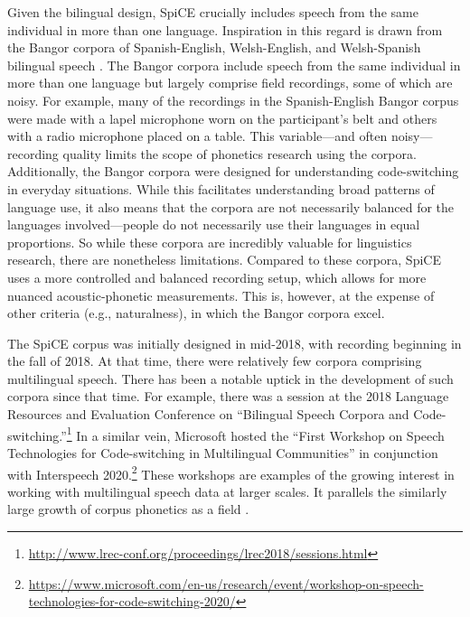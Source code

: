 Given the bilingual design, SpiCE crucially includes speech from the same individual in more than one language. Inspiration in this regard is drawn from the Bangor corpora of Spanish-English, Welsh-English, and Welsh-Spanish bilingual speech \citep{deuchar_2014_corpora}. The Bangor corpora include speech from the same individual in more than one language but largely comprise field recordings, some of which are noisy. For example, many of the recordings in the Spanish-English Bangor corpus were made with a lapel microphone worn on the participant's belt and others with a radio microphone placed on a table. This variable---and often noisy---recording quality limits the scope of phonetics research using the corpora. Additionally, the Bangor corpora were designed for understanding code-switching in everyday situations. While this facilitates understanding broad patterns of language use, it also means that the corpora are not necessarily balanced for the languages involved---people do not necessarily use their languages in equal proportions. So while these corpora are incredibly valuable for linguistics research, there are nonetheless limitations. Compared to these corpora, SpiCE uses a more controlled and balanced recording setup, which allows for more nuanced acoustic-phonetic measurements. This is, however, at the expense of other criteria (e.g., naturalness), in which the Bangor corpora excel.

The SpiCE corpus was initially designed in mid-2018, with recording beginning in the fall of 2018. At that time, there were relatively few corpora comprising multilingual speech. There has been a notable uptick in the development of such corpora since that time. For example, there was a session at the 2018 Language Resources and Evaluation Conference on ``Bilingual Speech Corpora and Code-switching.''\footnote{\url{http://www.lrec-conf.org/proceedings/lrec2018/sessions.html}} In a similar vein, Microsoft hosted the ``First Workshop on Speech Technologies for Code-switching in Multilingual Communities'' in conjunction with Interspeech 2020.\footnote{\url{https://www.microsoft.com/en-us/research/event/workshop-on-speech-technologies-for-code-switching-2020/}} These workshops are examples of the growing interest in working with multilingual speech data at larger scales. It parallels the similarly large growth of corpus phonetics as a field \citep{liberman_2019_corpus,grieve_2021_observation}.

